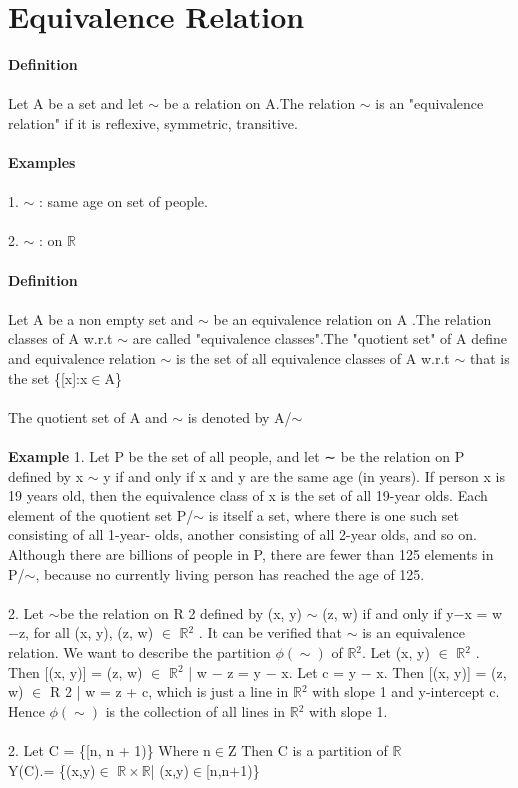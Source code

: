 \documentclass[a4paper,english,12pt]{article}
\begin{document}
\section{Equivalence Relation}
\textbf{Definition}\\\\
Let A be a set and let $\sim$ be a relation on A.The relation $\sim$ is an "equivalence relation" if it is reflexive, symmetric, transitive.\\\\
\textbf{Examples}\\\\
1. $\sim$ : same age on set of people.\\\\
2. $\sim$ : on $\mathbb{R}$\\\\
\textbf{Definition}\\\\
Let A be a non empty set and $\sim$ be an equivalence relation on A .The relation classes of A w.r.t $\sim$ are called "equivalence classes".The "quotient set" of A define and equivalence relation $\sim$ is the set of all equivalence classes of A w.r.t $\sim$ that is the set \{[x]:x$\in$A\}\\\\
The quotient set of A and $\sim$ is denoted by A/$\sim$\\\\
\textbf{Example}
1. Let P be the set of all people, and let ∼ be the relation on P defined
by x $\sim$ y if and only if x and y are the same age (in years). If person x is 19 years
old, then the equivalence class of x is the set of all 19-year olds. Each element of the
quotient set P/$\sim$ is itself a set, where there is one such set consisting of all 1-year-
olds, another consisting of all 2-year olds, and so on. Although there are billions of
people in P, there are fewer than 125 elements in P/$\sim$, because no currently living
person has reached the age of 125.\\\\
2. Let $\sim$be the relation on R 2 defined by (x, y) $\sim$ (z, w) if and only if y$-$x =
w$-$z, for all (x, y), (z, w) $\in$ $\mathbb{R}$$^2$ . It can be verified that $\sim$ is an equivalence relation. We
want to describe the partition $\phi(\sim)$ of $\mathbb{R}$$^2$. Let (x, y) $\in$ $\mathbb{R}$$^2$ . Then [(x, y)] = {(z, w) $\in$
$\mathbb{R}$$^2$ | w − z = y − x}. Let c = y − x. Then [(x, y)] = {(z, w) $\in$ R 2 | w = z + c}, which is
just a line in $\mathbb{R}$$^2$ with slope 1 and y-intercept c. Hence $\phi(\sim)$ is the collection of all
lines in $\mathbb{R}$$^2$ with slope 1.\\\\
2. Let C = \{[n, n + 1)\} Where n$\in$Z Then C is a partition of $\mathbb{R}$\\
Y(C).= \{(x,y)$\in$ $\mathbb{R}\times\mathbb{R}$| (x,y)$\in$[n,n$+$1)\}
  
\end{document}
